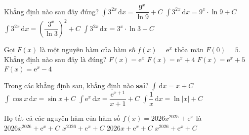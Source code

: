

\begin{ex}%
	Khẳng định nào sau đây  đúng?
	 \choice
		{\True  $\displaystyle\int 3^{2x}\mathrm{\,d}x=\dfrac{9^x}{\ln9}+C$}
		{$\displaystyle\int  3^{2x}\mathrm{\,d}x=9^x\cdot\ln9+C$}
		{$\displaystyle\int  3^{2x}\mathrm{\,d}x=\left(\dfrac{3^x}{\ln3}\right)^2+C$}
		 {$\displaystyle\int 3^{2x}\mathrm{\,d}x=3^x\cdot\ln3+C$}
\end{ex}

\begin{ex}%
	Gọi $F(x)$ là một nguyên hàm của hàm số $f(x)=\mathrm{e}^x$ thỏa mãn $F(0)=5$. Khẳng định nào sau đây là  đúng?
	\choice 
		 {$F(x)=\mathrm{e}^x$}
		 {\True $F(x)=\mathrm{e}^x+4$}
		{$F(x)=\mathrm{e}^x+5$} 
		{$F(x)=\mathrm{e}^x-4$} 
\end{ex}

\begin{ex}%
	 Trong các khẳng định sau, khẳng định nào \textbf{sai}?
	 \choice
		 {$\displaystyle\int \mathrm{\,d} x=x+C$}
		{$\displaystyle\int \cos x  \mathrm{\,d} x=\sin x+C$}
		{\True $\displaystyle\int \mathrm{e}^{x} \mathrm{\,d} x=\dfrac{\mathrm{e}^{x+1}}{x+1}+C$} 
		 {$\displaystyle\int \dfrac{1}{x} \mathrm{\,d} x=\ln |x|+C$}
\end{ex}

\begin{ex}%
	Họ tất cả các nguyên hàm của hàm  số $f(x)=2026x^{2025}+\mathrm{e}^x$ là
	 \choice
		{$2026  x^{2026}+\mathrm{e}^x+C$}
		 {$x^{2026}+\mathrm{e}^x+C$}
		{$2026  x+\mathrm{e}^x+C$}
		 {\True $x^{2026}+\mathrm{e}^x+C$}
\end{ex}

